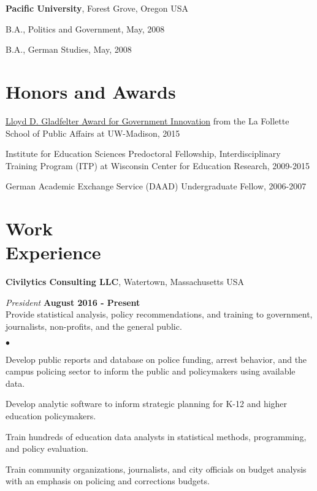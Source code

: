 \documentclass[margin,line]{res}
\newenvironment{list1}{
  \begin{list}{\ding{113}}{%
      \setlength{\itemsep}{0in}
      \setlength{\parsep}{0in} \setlength{\parskip}{0in}
      \setlength{\topsep}{0in} \setlength{\partopsep}{0in} 
      \setlength{\leftmargin}{0.17in}}}{\end{list}}
\newenvironment{list2}{
  \begin{list}{$\bullet$}{%
      \setlength{\itemsep}{0in}
      \setlength{\parsep}{0in} \setlength{\parskip}{0in}
      \setlength{\topsep}{0in} \setlength{\partopsep}{0in} 
      \setlength{\leftmargin}{0.2in}}}{\end{list}}
\begin{document}
\begin{resume}
{\bf Pacific University}, Forest Grove, Oregon USA\\
\vspace*{-.1in}
\begin{list1}
\item[] B.A., Politics and Government,  May, 2008
\item[] B.A., German Studies, May, 2008
\end{list1}


\section{\sc Honors and Awards} 

\href{https://www.lafollette.wisc.edu/news/2015-gladfelter-winners-announced}{Lloyd D. Gladfelter Award for Government Innovation} from the La Follette School of Public Affairs at UW-Madison, 2015

\vspace*{-2.5mm}

Institute for Education Sciences Predoctoral Fellowship, Interdisciplinary Training Program (ITP) at Wisconsin Center for Education Research, 2009-2015

\vspace*{-2.5mm}
German Academic Exchange Service (DAAD) Undergraduate Fellow, 2006-2007

\section{\sc Work \\ Experience}
{\bf Civilytics Consulting LLC}, Watertown, Massachusetts USA
\vspace{-.3cm}

{\em President} \hfill {\bf August 2016 - Present}\\
Provide statistical analysis, policy recommendations, and training to government, 
journalists, non-profits, and the general public. 
\begin{list2}
\item Develop public reports and database on police funding, arrest behavior, and the campus 
policing sector to inform the public and policymakers using available data.
\item Develop analytic software to inform strategic planning for K-12 and higher 
education policymakers. 
\item Train hundreds of education data analysts in statistical methods, programming, 
and policy evaluation.
\item Train community organizations, journalists, and city officials on budget 
analysis with an emphasis on policing and corrections budgets. 
\end{list2}



\end{resume}
\end{document}
